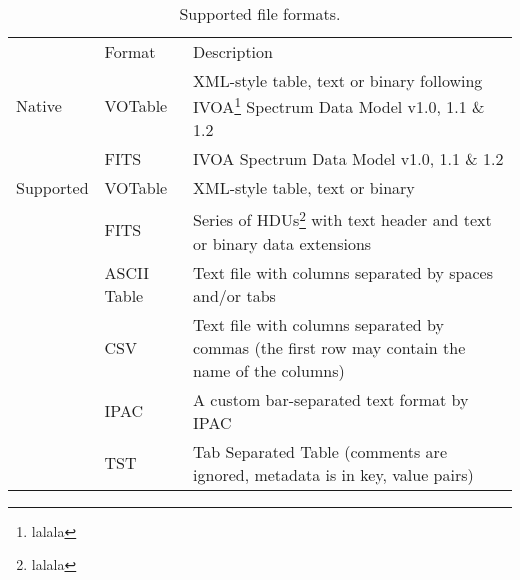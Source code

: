 \begin{table}[h]
\caption{Supported file formats.}
\centering
\begin{tabular}{@{}lll@{}}
\toprule
          & Format      & Description \\
\cmidrule{2-3}
Native    & VOTable     & XML-style table, text or binary following IVOA\footnote{lalala} Spectrum Data Model v1.0, 1.1 \& 1.2 \\
          & FITS        & IVOA Spectrum Data Model v1.0, 1.1 \& 1.2 \\
\cmidrule{2-3}
Supported & VOTable     & XML-style table, text or binary \\
          & FITS        & Series of HDUs\footnote{lalala} with text header and text or binary data extensions \\
          & ASCII Table & Text file with columns separated by spaces and/or tabs \\
          & CSV         & Text file with columns separated by commas (the first row may contain the name of the columns) \\
          & IPAC        & A custom bar-separated text format by IPAC \\
          & TST         & Tab Separated Table (comments are ignored, metadata is in key, value pairs) \\
\bottomrule                                                                         
\end{tabular}
\end{table}